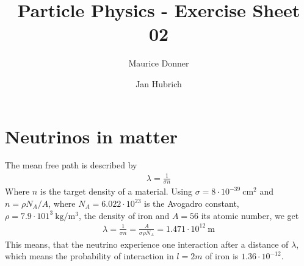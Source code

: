 \documentclass{article}
\title{\textsf{\color{blue!40!black}Particle Physics - Exercise Sheet 02}}
\author{Maurice Donner \and Jan Hubrich}
\begin{document}
\maketitle
\newpage
\section{Neutrinos in matter}
The mean free path is described by
\begin{align}
    \lambda = \frac{1}{\sigma n}
\end{align}
Where \( n \) is the target density of a material. Using \( \sigma =
8 \cdot 10 ^{-39} \ \si{\centi \meter ^2}\) and \( n = \rho N_A/A \), where
\( N_A = 6.022 \cdot 10 ^{23}\) is the Avogadro constant, \( \rho = 
7.9 \cdot 101 ^{3} \ \si{\kilo \gram \per \meter ^3}\), the density of iron
and \( A = 56 \) its atomic number, we get
\begin{align}
    \lambda = \frac{1}{\sigma n} = \frac{A}{\sigma \rho N_A} = 1.471
    \cdot 10 ^{12} \ \si{\meter}
\end{align}
This means, that the neutrino experience one interaction after a distance
of \( \lambda \), which means the probability of interaction in \( l = 2m \) of
iron is \( 1.36 \cdot 10 ^{-12} \). 
\end{document}
